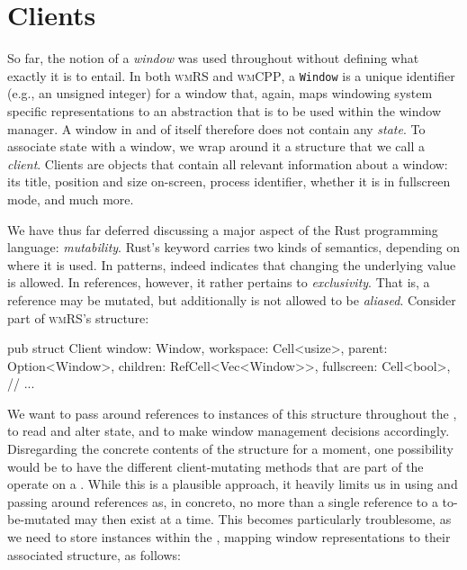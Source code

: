 \section{Clients}

So far, the notion of a \textit{window} was used throughout without defining
what exactly it is to entail. In both \textsc{wmRS} and \textsc{wmCPP}, a
\texttt{Window} is a unique identifier (e.g., an unsigned integer) for a
window that, again, maps windowing system specific representations to an
abstraction that is to be used within the window manager. A window in and of
itself therefore does not contain any \textit{state}. To associate state with a
window, we wrap around it a structure that we call a \textit{client}. Clients
are objects that contain all relevant information about a window: its title,
position and size on-screen, process identifier, whether it is in fullscreen
mode, and much more.


We have thus far deferred discussing a major aspect of the Rust programming
language: \textit{mutability}. Rust's  keyword carries two kinds
of semantics, depending on where it is used. In patterns,  indeed
indicates that changing the underlying value is allowed. In references, however,
it rather pertains to \textit{exclusivity}. That is, a  reference may
be mutated, but additionally is not allowed to be \textit{aliased}. Consider
part of \textsc{wmRS}'s  structure:

\begin{rustblock}
  pub struct Client {
    window: Window,
    workspace: Cell<usize>,
    parent: Option<Window>,
    children: RefCell<Vec<Window>>,
    fullscreen: Cell<bool>,
    // ...
  }
\end{rustblock}

We want to pass around references to instances of this structure throughout the
, to read and alter state, and to make window management decisions
accordingly. Disregarding the concrete contents of the  structure
for a moment, one possibility would be to have the different client-mutating
methods that are part of the  operate on a . While
this is a plausible approach, it heavily limits us in using and passing around
references as, in concreto, no more than a single reference to a to-be-mutated
 may then exist at a time. This becomes particularly troublesome,
as we need to store  instances within the , mapping
window representations to their associated  structure, as follows:

